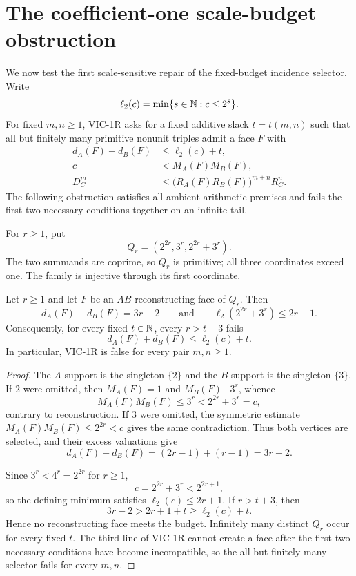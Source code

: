 \section{The coefficient-one scale-budget obstruction}
\label{sec:vic-scale-budget-obstruction}

We now test the first scale-sensitive repair of the fixed-budget incidence
selector.  Write
\[
 \ell_2(c)=\min\{s\in\mathbb N:c\le 2^s\}.
\]
For fixed $m,n\ge1$, VIC-1R asks for a fixed additive slack $t=t(m,n)$
such that all but finitely many primitive nonunit triples admit a face $F$
with
\begin{equation}
 \begin{aligned}
 d_A(F)+d_B(F)&\le \ell_2(c)+t,\\
 c&<M_A(F)M_B(F),\\
 D_C^m&\le\bigl(R_A(F)R_B(F)\bigr)^{m+n}R_C^n.
 \end{aligned}
 \tag{VIC-1R}
\end{equation}
The following obstruction satisfies all ambient arithmetic premises and
fails the first two necessary conditions together on an infinite tail.

For $r\ge1$, put
\[
 Q_r=(2^{2r},3^r,2^{2r}+3^r).
\]
The two summands are coprime, so $Q_r$ is primitive; all three coordinates
exceed one.  The family is injective through its first coordinate.

\begin{theorem}
\label{thm:vic-scale-budget-obstruction}
Let $r\ge1$ and let $F$ be an $AB$-reconstructing face of $Q_r$.  Then
\[
 d_A(F)+d_B(F)=3r-2
 \qquad\text{and}\qquad
 \ell_2(2^{2r}+3^r)\le 2r+1.
\]
Consequently, for every fixed $t\in\mathbb N$, every $r>t+3$ fails
\[
 d_A(F)+d_B(F)\le\ell_2(c)+t.
\]
In particular, VIC-1R is false for every pair $m,n\ge1$.
\end{theorem}

\begin{proof}
The $A$-support is the singleton $\{2\}$ and the $B$-support is the
singleton $\{3\}$.  If $2$ were omitted, then $M_A(F)=1$ and
$M_B(F)\mid3^r$, whence
\[
 M_A(F)M_B(F)\le3^r<2^{2r}+3^r=c,
\]
contrary to reconstruction.  If $3$ were omitted, the symmetric estimate
$M_A(F)M_B(F)\le2^{2r}<c$ gives the same contradiction.  Thus both vertices
are selected, and their excess valuations give
\[
 d_A(F)+d_B(F)=(2r-1)+(r-1)=3r-2.
\]

Since $3^r<4^r=2^{2r}$ for $r\ge1$,
\[
 c=2^{2r}+3^r<2^{2r+1},
\]
so the defining minimum satisfies $\ell_2(c)\le2r+1$.  If $r>t+3$, then
\[
 3r-2>2r+1+t\ge\ell_2(c)+t.
\]
Hence no reconstructing face meets the budget.  Infinitely many distinct
$Q_r$ occur for every fixed $t$.  The third line of VIC-1R cannot create a
face after the first two necessary conditions have become incompatible, so
the all-but-finitely-many selector fails for every $m,n$.
\end{proof}

